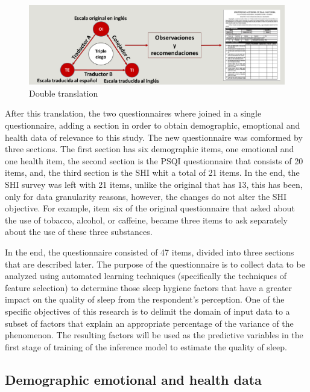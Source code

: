 \documentclass[]{book}
\begin{document}
\begin{figure}

{\centering \includegraphics[width=0.8\linewidth]{images/double-translation} 

}

\caption{Double translation}\label{fig:double-tr}
\end{figure}

After this translation, the two questionnaires where joined in a single
questionnaire, adding a section in order to obtain demographic,
emoptional and health data of relevance to this study. The new
questionnaire was comformed by three sections. The first section has six
demographic items, one emotional and one health item, the second section
is the PSQI questionnaire that consists of 20 items, and, the third
section is the SHI whit a total of 21 items. In the end, the SHI survey
was left with 21 items, unlike the original that has 13, this has been,
only for data granularity reasons, however, the changes do not alter the
SHI objective. For example, item six of the original questionnaire that
asked about the use of tobacco, alcohol, or caffeine, became three items
to ask separately about the use of these three substances.

In the end, the questionnaire consisted of 47 items, divided into three
sections that are described later. The purpose of the questionnaire is
to collect data to be analyzed using automated learning techniques
(specifically the techniques of feature selection) to determine those
sleep hygiene factors that have a greater impact on the quality of sleep
from the respondent's perception. One of the specific objectives of this
research is to delimit the domain of input data to a subset of factors
that explain an appropriate percentage of the variance of the
phenomenon. The resulting factors will be used as the predictive
variables in the first stage of training of the inference model to
estimate the quality of sleep.

\subsection{Demographic emotional and health
data}\label{demographic-emotional-and-health-data}
\end{document}
